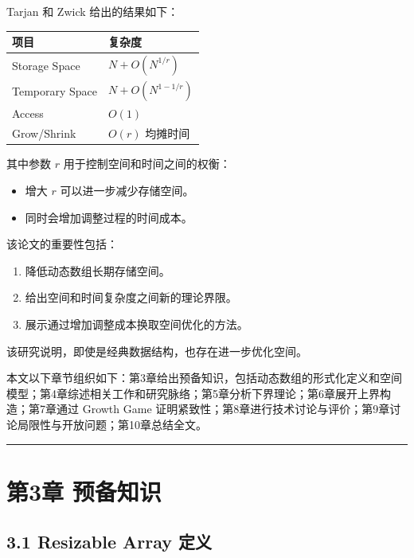 \documentclass[
  UTF8,
  a4paper,
  12pt]{ctexart}
\newcounter{none} %
\providecommand{\tightlist}{%
  \setlength{\itemsep}{0pt}\setlength{\parskip}{0pt}}
\begin{document}
Tarjan 和 Zwick 给出的结果如下：

{\def\LTcaptype{none} %
\begin{longtable}[]{@{}ll@{}}
\toprule\noalign{}
项目 & 复杂度 \\
\midrule\noalign{}
\endhead
\bottomrule\noalign{}
\endlastfoot
Storage Space & \(N+O(N^{1/r})\) \\
Temporary Space & \(N+O(N^{1-1/r})\) \\
Access & \(O(1)\) \\
Grow/Shrink & \(O(r)\) 均摊时间 \\
\end{longtable}
}

其中参数 \(r\) 用于控制空间和时间之间的权衡：

\begin{itemize}
\tightlist
\item
  增大 \(r\) 可以进一步减少存储空间。
\item
  同时会增加调整过程的时间成本。
\end{itemize}

该论文的重要性包括：

\begin{enumerate}
\def\labelenumi{\arabic{enumi}.}
\tightlist
\item
  降低动态数组长期存储空间。
\item
  给出空间和时间复杂度之间新的理论界限。
\item
  展示通过增加调整成本换取空间优化的方法。
\end{enumerate}

该研究说明，即使是经典数据结构，也存在进一步优化空间。

本文以下章节组织如下：第3章给出预备知识，包括动态数组的形式化定义和空间模型；第4章综述相关工作和研究脉络；第5章分析下界理论；第6章展开上界构造；第7章通过
Growth Game
证明紧致性；第8章进行技术讨论与评价；第9章讨论局限性与开放问题；第10章总结全文。

\begin{center}\rule{0.5\linewidth}{0.5pt}\end{center}

\section{第3章 预备知识}\label{ux7b2c3ux7ae0-ux9884ux5907ux77e5ux8bc6}

\subsection{3.1 Resizable Array
定义}\label{resizable-array-ux5b9aux4e49}
\end{document}
